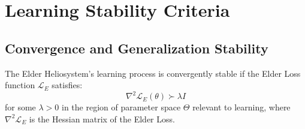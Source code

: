 \section{Learning Stability Criteria}

\subsection{Convergence and Generalization Stability}

\begin{theorem}
The Elder Heliosystem's learning process is convergently stable if the Elder Loss function $\mathcal{L}_E$ satisfies:
\begin{equation}
\nabla^2 \mathcal{L}_E(\theta) \succ \lambda I
\end{equation}
for some $\lambda > 0$ in the region of parameter space $\Theta$ relevant to learning, where $\nabla^2 \mathcal{L}_E$ is the Hessian matrix of the Elder Loss.
\end{theorem}

